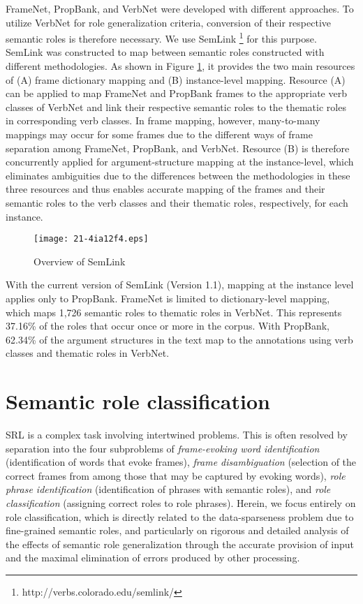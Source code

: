 \documentclass[english]{jnlp_1.4_rep}
\begin{document}
FrameNet, PropBank, and VerbNet were developed with different approaches. To utilize VerbNet for role generalization criteria, conversion of their respective semantic roles is therefore necessary. We use SemLink \cite{loper2007clr}\footnote{http://verbs.colorado.edu/semlink/} for this purpose. SemLink was constructed to map between semantic roles constructed with different methodologies. As shown in Figure \ref{fig:semlink}, it provides the two main resources of (A) frame dictionary mapping and (B) instance-level mapping. Resource (A) can be applied to map FrameNet and PropBank frames to the appropriate verb classes of VerbNet and link their respective semantic roles to the thematic roles in corresponding verb classes. In frame mapping, however, many-to-many mappings may occur for some frames due to the different ways of frame separation among FrameNet, PropBank, and VerbNet. Resource (B) is therefore concurrently applied for argument-structure mapping at the instance-level, which eliminates ambiguities due to the differences between the methodologies in these three resources and thus enables accurate mapping of the frames and their semantic roles to the verb classes and their thematic roles, respectively, for each instance.

\begin{figure}[t]
\begin{center}
\texttt{[image: 21-4ia12f4.eps]}
\end{center}
\caption{Overview of SemLink}
\label{fig:semlink}
\end{figure}

With the current version of SemLink (Version 1.1), mapping at the instance level applies only to PropBank.
FrameNet is limited to dictionary-level mapping, which maps 1,726 semantic roles to thematic roles in VerbNet. This represents 37.16\% of the roles that occur once or more in the corpus. With PropBank, 62.34\% of the argument structures in the text map to the annotations using verb classes and thematic roles in VerbNet.


\section{Semantic role classification}
\label{sec:role-classification}

SRL is a complex task involving intertwined problems. This is often resolved by separation into the four subproblems of {\it frame-evoking word identification} (identification of words that evoke frames), {\it frame disambiguation} (selection of the correct frames from among those that may be captured by evoking words), {\it role phrase identification} (identification of phrases with semantic roles), and {\it role classification} (assigning correct roles to role phrases). Herein, we focus entirely on role classification, which is directly related to the data-sparseness problem due to fine-grained semantic roles, and particularly on rigorous and detailed analysis of the effects of semantic role generalization through the accurate provision of input and the maximal elimination of errors produced by other processing.
\end{document}

